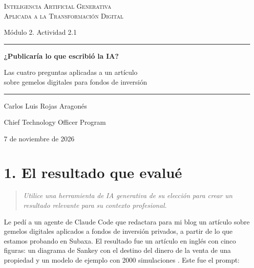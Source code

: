 \documentclass[11pt,letterpaper]{article}
\newcommand{\pregunta}[1]{%
  \begin{quote}\color{cGris}\small\itshape #1\end{quote}}
\begin{document}
\begin{titlepage}
\centering
\vspace*{3.2cm}
{\large\scshape Inteligencia Artificial Generativa\\
Aplicada a la Transformación Digital\par}
\vspace{0.5cm}
{\normalsize Módulo 2. Actividad 2.1\par}
\vspace{2.6cm}
{\color{cEje}\rule{0.55\textwidth}{0.8pt}\par}
\vspace{0.7cm}
{\LARGE\bfseries ¿Publicaría lo que escribió la IA?\par}
\vspace{0.5cm}
{\large Las cuatro preguntas aplicadas a un artículo\\
sobre gemelos digitales para fondos de inversión\par}
\vspace{0.7cm}
{\color{cEje}\rule{0.55\textwidth}{0.8pt}\par}
\vfill
{\large Carlos Luis Rojas Aragonés\par}
\vspace{0.3cm}
{\normalsize Chief Technology Officer Program\par}
\vspace{0.3cm}
{\normalsize 7 de noviembre de 2026\par}
\vspace*{1.5cm}
\end{titlepage}

\section*{1. El resultado que evalué}

\pregunta{Utilice una herramienta de IA generativa de su elección para crear
un resultado relevante para su contexto profesional.}

Le pedí a un agente de Claude Code que redactara para mi blog un artículo
sobre gemelos digitales aplicados a fondos de inversión privados, a partir de
lo que estamos probando en Subaxa. El resultado fue un artículo en inglés con
cinco figuras: un diagrama de Sankey con el destino del dinero de la venta de
una propiedad y un modelo de ejemplo con 2000 simulaciones
\parencite{rojas2026twins}. Este fue el prompt:
\end{document}
